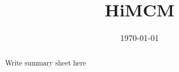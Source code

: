 \documentclass{class}
\title{HiMCM}
\date{\today}
\begin{document}
\begin{abstract}
Write summary sheet here
\end{abstract}

\maketitle




\tableofcontents

\newpage


















\newpage


{\tiny

}

\pagebreak


\end{document}
